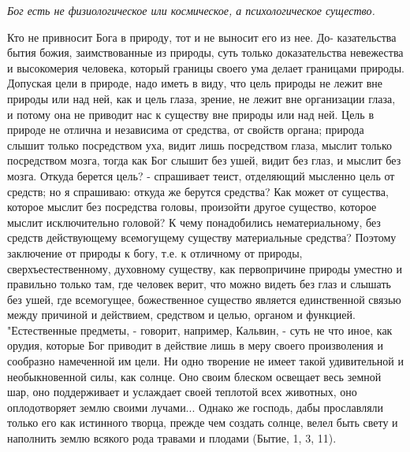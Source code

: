 \documentclass[12pt,oneside]{book}
\begin{document}
\emph{Бог есть не физиологическое или космическое, а психологическое существо.}

Кто не привносит Бога в природу, тот и не выносит его из нее. До- казательства бытия божия, заимствованные из природы, суть только доказательства невежества и высокомерия человека, который границы своего ума делает границами природы.
 Допуская цели в природе, надо иметь в виду, что цель природы не лежит вне природы или над ней, как и цель глаза, зрение, не лежит вне организации глаза, и потому она не приводит нас к существу вне природы или над ней. Цель в природе не отлична и независима от средства, от свойств органа; природа слышит только посредством уха, видит лишь посредством глаза, мыслит только посредством мозга, тогда как Бог слышит без ушей, видит без глаз, и мыслит без мозга. Откуда берется цель? - спрашивает теист, отделяющий мысленно цель от средств; но я спрашиваю: откуда же берутся средства? Как может от существа, которое мыслит без посредства головы, произойти другое существо, которое мыслит исключительно головой? К чему понадобились нематериальному, без средств действующему всемогущему существу материальные средства? Поэтому заключение от природы к богу, т.е. к отличному от природы, сверхъестественному, духовному существу, как первопричине природы уместно и правильно только там, где человек верит, что можно видеть без глаз и слышать без ушей, где всемогущее, божественное существо является единственной связью между причиной и действием, средством и целью, органом и функцией. "Естественные предметы, - говорит, например, Кальвин, - суть не что иное, как орудия, которые Бог приводит в действие лишь в меру своего произволения и сообразно намеченной им цели. Ни одно творение не имеет такой удивительной и необыкновенной силы, как солнце. Оно своим блеском освещает весь земной шар, оно поддерживает и услаждает своей теплотой всех животных, оно оплодотворяет землю своими лучами... Однако же господь, дабы прославляли только его как истинного творца, прежде чем создать солнце, велел быть свету и наполнить землю всякого рода травами и плодами (Бытие, 1, 3, 11).
\end{document}
